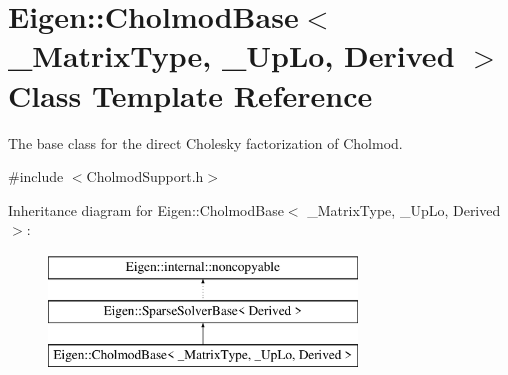 \hypertarget{class_eigen_1_1_cholmod_base}{}\section{Eigen\+::Cholmod\+Base$<$ \+\_\+\+Matrix\+Type, \+\_\+\+Up\+Lo, Derived $>$ Class Template Reference}
\label{class_eigen_1_1_cholmod_base}


The base class for the direct Cholesky factorization of Cholmod.  




{\ttfamily \#include $<$Cholmod\+Support.\+h$>$}

Inheritance diagram for Eigen\+::Cholmod\+Base$<$ \+\_\+\+Matrix\+Type, \+\_\+\+Up\+Lo, Derived $>$\+:\begin{figure}[H]
\begin{center}
\leavevmode
\includegraphics[height=3.000000cm]{class_eigen_1_1_cholmod_base}
\end{center}
\end{figure}
